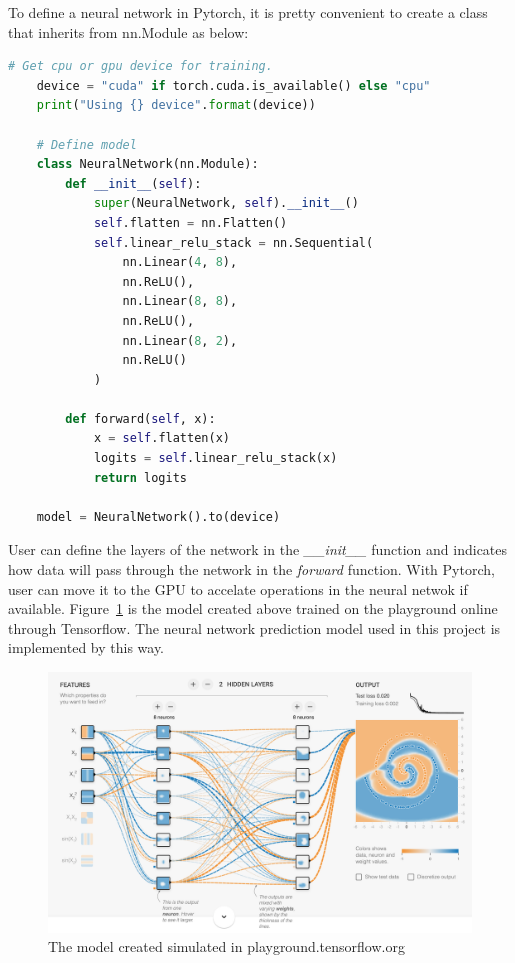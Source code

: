 \documentclass[final-report]{report-template}
\begin{document}
To define a neural network in Pytorch, it is pretty convenient to create a class that inherits from nn.Module as below:
\begin{lstlisting}[language=Python]
    # Get cpu or gpu device for training.
    device = "cuda" if torch.cuda.is_available() else "cpu"
    print("Using {} device".format(device))
    
    # Define model
    class NeuralNetwork(nn.Module):
        def __init__(self):
            super(NeuralNetwork, self).__init__()
            self.flatten = nn.Flatten()
            self.linear_relu_stack = nn.Sequential(
                nn.Linear(4, 8),
                nn.ReLU(),
                nn.Linear(8, 8),
                nn.ReLU(),
                nn.Linear(8, 2),
                nn.ReLU()
            )
    
        def forward(self, x):
            x = self.flatten(x)
            logits = self.linear_relu_stack(x)
            return logits
    
    model = NeuralNetwork().to(device)
\end{lstlisting}
User can define the layers of the network in the \textit{\_\_init\_\_} function and indicates how data will pass through the network in the \textit{forward} function. 
With Pytorch, user can move it to the GPU to accelate operations in the neural netwok if available. Figure~\ref{fig:neural_network_example} is the model created above trained on the playground online through Tensorflow. 
The neural network prediction model used in this project is implemented by this way.
\begin{figure}
    \begin{center}
        \includegraphics[width=1\textwidth]{neural_network_exmaple.png}
    \end{center}
    \caption{\label{fig:neural_network_example} The model created simulated in playground.tensorflow.org}
\end{figure}
\end{document}
